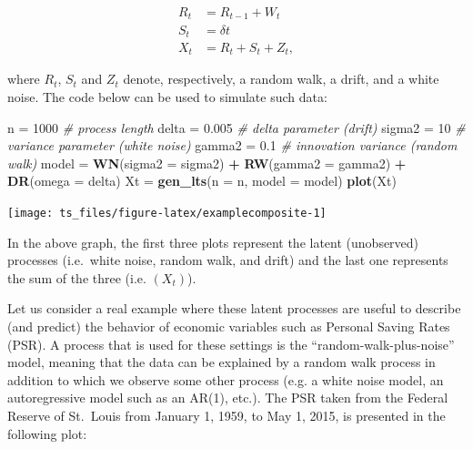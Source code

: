 \documentclass[]{book}
\newenvironment{Shaded}{\begin{snugshade}}{\end{snugshade}}
\newcommand{\KeywordTok}[1]{\textcolor[rgb]{0.13,0.29,0.53}{\textbf{#1}}}
\newcommand{\DataTypeTok}[1]{\textcolor[rgb]{0.13,0.29,0.53}{#1}}
\newcommand{\DecValTok}[1]{\textcolor[rgb]{0.00,0.00,0.81}{#1}}
\newcommand{\FloatTok}[1]{\textcolor[rgb]{0.00,0.00,0.81}{#1}}
\newcommand{\StringTok}[1]{\textcolor[rgb]{0.31,0.60,0.02}{#1}}
\newcommand{\CommentTok}[1]{\textcolor[rgb]{0.56,0.35,0.01}{\textit{#1}}}
\newcommand{\OperatorTok}[1]{\textcolor[rgb]{0.81,0.36,0.00}{\textbf{#1}}}
\newcommand{\NormalTok}[1]{#1}
\theoremstyle{definition}
\theoremstyle{definition}
\theoremstyle{definition}
\theoremstyle{remark}
\begin{document}
\[\begin{aligned}
R_t &= R_{t-1} + W_t \\
S_t &= \delta t \\
X_t &= R_t + S_t + Z_t,
\end{aligned}\]

where \(R_t\), \(S_t\) and \(Z_t\) denote, respectively, a random walk,
a drift, and a white noise. The code below can be used to simulate such
data:

\begin{Shaded}
\begin{Highlighting}[]
\NormalTok{n =}\StringTok{ }\DecValTok{1000}                                \CommentTok{# process length}
\NormalTok{delta =}\StringTok{ }\FloatTok{0.005}                           \CommentTok{# delta parameter (drift)}
\NormalTok{sigma2 =}\StringTok{ }\DecValTok{10}                             \CommentTok{# variance parameter (white noise)}
\NormalTok{gamma2 =}\StringTok{ }\FloatTok{0.1}                            \CommentTok{# innovation variance (random walk)}
\NormalTok{model =}\StringTok{ }\KeywordTok{WN}\NormalTok{(}\DataTypeTok{sigma2 =}\NormalTok{ sigma2) }\OperatorTok{+}\StringTok{ }\KeywordTok{RW}\NormalTok{(}\DataTypeTok{gamma2 =}\NormalTok{ gamma2) }\OperatorTok{+}\StringTok{ }\KeywordTok{DR}\NormalTok{(}\DataTypeTok{omega =}\NormalTok{ delta)}
\NormalTok{Xt =}\StringTok{ }\KeywordTok{gen_lts}\NormalTok{(}\DataTypeTok{n =}\NormalTok{ n, }\DataTypeTok{model =}\NormalTok{ model)}
\KeywordTok{plot}\NormalTok{(Xt)}
\end{Highlighting}
\end{Shaded}

\begin{center}\texttt{[image: ts\_files/figure-latex/examplecomposite-1]} \end{center}

In the above graph, the first three plots represent the latent
(unobserved) processes (i.e.~white noise, random walk, and drift) and
the last one represents the sum of the three (i.e. \((X_t)\)).

Let us consider a real example where these latent processes are useful
to describe (and predict) the behavior of economic variables such as
Personal Saving Rates (PSR). A process that is used for these settings
is the ``random-walk-plus-noise'' model, meaning that the data can be
explained by a random walk process in addition to which we observe some
other process (e.g. a white noise model, an autoregressive model such as
an AR(1), etc.). The PSR taken from the Federal Reserve of St.~Louis
from January 1, 1959, to May 1, 2015, is presented in the following
plot:
\end{document}
